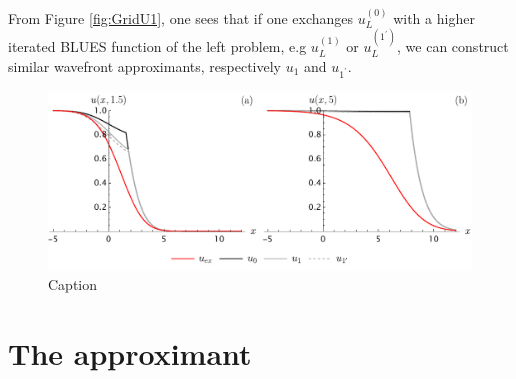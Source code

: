 \documentclass[amsmath,amssymb,amsfonts,aps,pre,preprint,superscriptaddress,bibnotes,showpacs,showkeys,longbibliography]{revtex4-1}
\begin{document}
From Figure \ref{fig:GridU1}, one sees that if one exchanges $u^{(0)}_{L}$ with a higher iterated BLUES function of the left problem, e.g $u^{(1)}_{L}$ or $u^{(1^\prime)}_{L}$, we can construct similar wavefront approximants, respectively $u_1$ and $u_{1^\prime}$.
\begin{figure}[t]
    \centering
    \includegraphics[width=\linewidth]{Figures/PiecewiseApproxGridAlt.pdf}
    \caption{Caption}
    \label{fig:PiecewiseApproxGrid}
\end{figure}
\section{The approximant}\label{sec:The_approximant}
\end{document}
